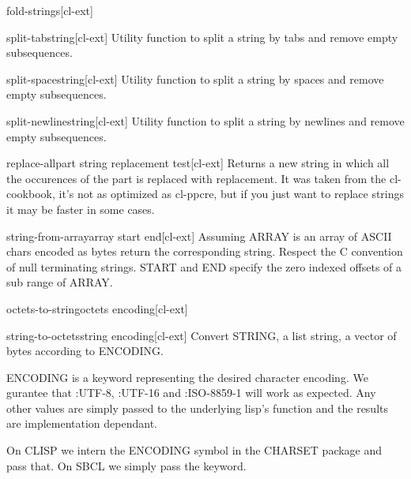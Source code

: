 \documentclass[10pt,english]{book}
\begin{document}
\begin{function}{fold-strings}{}[cl-ext]
  
\end{function}

\begin{function}{split-tab}{string}[cl-ext]
  Utility function to split a string by tabs and remove empty
  subsequences.
\end{function}

\begin{function}{split-space}{string}[cl-ext]
  Utility function to split a string by spaces and remove empty
  subsequences.
\end{function}

\begin{function}{split-newline}{string}[cl-ext]
  Utility function to split a string by newlines and remove empty
  subsequences.
\end{function}

\begin{function}{replace-all}{part string replacement \key test}[cl-ext]
  Returns a new string in which all the occurences of the part is
  replaced with replacement. It was taken from the cl-cookbook, it's
  not as optimized as cl-ppcre, but if you just want to replace
  strings it may be faster in some cases.
\end{function}

\begin{function}{string-from-array}{array \key start end}[cl-ext]
  Assuming ARRAY is an array of ASCII chars encoded as bytes return
the corresponding string. Respect the C convention of null terminating
strings. START and END specify the zero indexed offsets of a sub range
of ARRAY.
\end{function}

\begin{function}{octets-to-string}{octets encoding}[cl-ext]
  
\end{function}

\begin{function}{string-to-octets}{string encoding}[cl-ext]
  Convert STRING, a list string, a vector of bytes according to ENCODING.

ENCODING is a keyword representing the desired character
encoding. We gurantee that :UTF-8, :UTF-16 and :ISO-8859-1 will
work as expected. Any other values are simply passed to the
underlying lisp's function and the results are implementation
dependant.

On CLISP we intern the ENCODING symbol in the CHARSET package and
pass that. On SBCL we simply pass the keyword.
\end{function}
\end{document}
